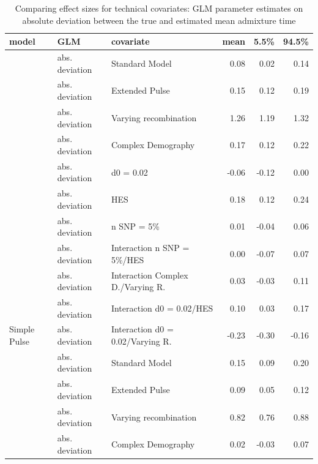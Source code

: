 \documentclass[11pt]{article}
\begin{document}
\begin{table}[H]

\caption{\label{tab:table_Supplements_ests_deviation}Comparing effect sizes for technical covariates: GLM parameter estimates on absolute deviation between  the true and estimated mean admixture time}
\centering
\begin{tabular}[t]{l|l|l|r|r|r}
\hline
model & GLM & covariate & mean & 5.5\% & 94.5\%\\
\hline
 & abs. deviation & Standard Model & 0.08 & 0.02 & 0.14\\

 & abs. deviation & Extended Pulse & 0.15 & 0.12 & 0.19\\

 & abs. deviation & Varying recombination & 1.26 & 1.19 & 1.32\\

 & abs. deviation & Complex Demography & 0.17 & 0.12 & 0.22\\

 & abs. deviation & d0 = 0.02 & -0.06 & -0.12 & 0.00\\

 & abs. deviation & HES & 0.18 & 0.12 & 0.24\\

 & abs. deviation & n SNP = 5\% & 0.01 & -0.04 & 0.06\\

 & abs. deviation & Interaction n SNP = 5\%/HES & 0.00 & -0.07 & 0.07\\

 & abs. deviation & Interaction Complex D./Varying R. & 0.03 & -0.03 & 0.11\\

 & abs. deviation & Interaction d0 = 0.02/HES & 0.10 & 0.03 & 0.17\\

\multirow{-11}{*}{\raggedright\arraybackslash Simple Pulse} & abs. deviation & Interaction d0 = 0.02/Varying R. & -0.23 & -0.30 & -0.16\\
\cline{1-6}
 & abs. deviation & Standard Model & 0.15 & 0.09 & 0.20\\

 & abs. deviation & Extended Pulse & 0.09 & 0.05 & 0.12\\

 & abs. deviation & Varying recombination & 0.82 & 0.76 & 0.88\\

 & abs. deviation & Complex Demography & 0.02 & -0.03 & 0.07\\


\end{tabular}
\end{table}
\end{document}
